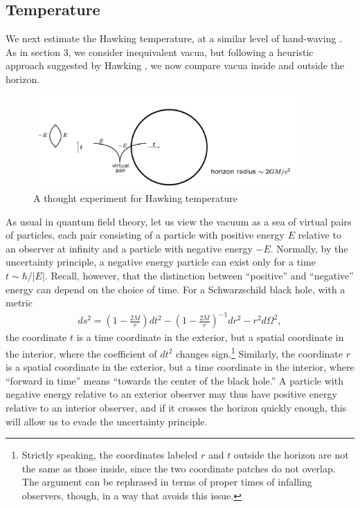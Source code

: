 \documentclass[12pt]{article}
\begin{document}
\subsection{Temperature \label{Tempa}}
We next estimate the Hawking temperature, at a similar level of hand-waving
\cite{Schutz}.  As in section 3, we consider inequivalent vacua,
but following a heuristic approach suggested by Hawking \cite{Hawkingc}, we 
now compare vacua inside and outside the horizon. 
\begin{figure}
\centerline{\includegraphics[width=4in]{fig2b.pdf}}
\caption{A thought experiment for Hawking temperature}
\label{Carlipfig2}
\end{figure}

As usual in quantum field theory, let us view the vacuum as a sea
of virtual pairs of particles, each pair consisting of a particle
with positive energy $E$ relative to an observer at infinity and a particle
with negative energy $-E$.  Normally, by
the uncertainty principle, a negative energy particle can exist only for a 
time $t\sim \hbar/|E|$.  Recall, however, that the distinction between 
``positive'' and ``negative'' energy can depend on the choice of time.
For a Schwarzschild black hole, with a metric
\begin{align}
ds^2 = \left(1-\frac{2M}{r}\right)dt^2 - \left(1-\frac{2M}{r}\right)^{-1}dr^2
        - r^2d\Omega^2  ,
\label{Carlipd4}
\end{align}
the coordinate $t$ is a time coordinate in the exterior, but a spatial coordinate
in the interior, where the coefficient of $dt^2$ changes sign.\footnote{Strictly 
speaking, the coordinates labeled $r$ and $t$ outside the 
horizon are not the same as those inside, since the two coordinate patches 
do not overlap.  The argument can be rephrased in terms of proper times of
infalling observers, though, in a way that avoids this issue.}
Similarly, the coordinate $r$ is a spatial coordinate in the exterior, but a time 
coordinate in the interior, where ``forward in time'' means ``towards the 
center of the black hole.''   A particle with negative energy relative to an 
exterior observer may thus have positive energy relative to an interior 
observer, and if it crosses the horizon quickly enough, this will allow us to 
evade the uncertainty principle.
\end{document}
